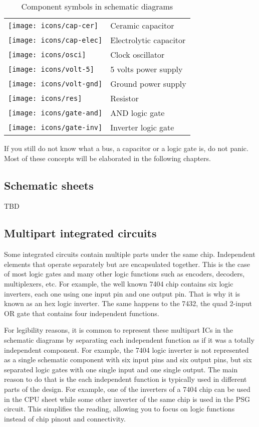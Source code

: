 \begin{table}[h!]
	\centering
	\begin{tabular}{ m{25mm}|l }
		\centering\texttt{[image: icons/cap-cer]}  & Ceramic capacitor      \\
		\centering\texttt{[image: icons/cap-elec]} & Electrolytic capacitor \\
		\centering\texttt{[image: icons/osci]}     & Clock oscillator       \\
		\centering\texttt{[image: icons/volt-5]}   & 5 volts power supply   \\
		\centering\texttt{[image: icons/volt-gnd]} & Ground power supply    \\
		\centering\texttt{[image: icons/res]}      & Resistor               \\
		\centering\texttt{[image: icons/gate-and]} & AND logic gate         \\
		\centering\texttt{[image: icons/gate-inv]} & Inverter logic gate    \\
	\end{tabular}
	\caption{Component symbols in schematic diagrams}
	\label{table:schematic-symbols}
\end{table}

If you still do not know what a bus, a capacitor or a logic gate is, do not panic. Most of these concepts will be elaborated in the following chapters.

\subsection{Schematic sheets}

TBD

\subsection{Multipart integrated circuits}

Some integrated circuits contain multiple parts under the same chip. Independent elements that operate separately but are encapsulated together. This is the case of most logic gates and many other logic functions such as encoders, decoders, multiplexers, etc. For example, the well known 7404 chip contains six logic inverters, each one using one input pin and one output pin. That is why it is known as an hex logic inverter. The same happens to the 7432, the quad 2-input OR gate that contains four independent functions. 

For legibility reasons, it is common to represent these multipart ICs in the schematic diagrams by separating each independent function as if it was a totally independent component. For example, the 7404 logic inverter is not represented as a single schematic component with six input pins and six output pins, but six separated logic gates with one single input and one single output. The main reason to do that is the each independent function is typically used in different parts of the design. For example, one of the inverters of a 7404 chip can be used in the CPU sheet while some other inverter of the same chip is used in the PSG circuit. This simplifies the reading, allowing you to focus on logic functions instead of chip pinout and connectivity. 

